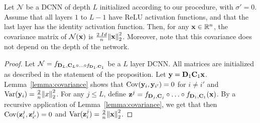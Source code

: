 \begin{proposition} \label{proposition:initialization}
Let $\mathcal{N}$ be a DCNN of depth $L$ initialized according to our procedure, with $\sigma'=0$.
Assume that all layers $1$ to $L-1$ have ReLU activation functions, and that the last layer has the identity activation function.
Then, for any $\mathbf{x} \in {\ensuremath \mathbb{R}}^{n}$, the covariance matrix of $\mathcal{N}(\mathbf{x})$ is $\frac{2.Id}{n}\norm{\mathbf{x}}_{2}^{2}$.
Moreover, note that this covariance does not depend on the depth of the network.
\end{proposition}
\begin{proof} 
Let $\mathcal{N} = f_{\mathbf{D}_{L}, \mathbf{C}_{L} \circ \ldots \circ f_{\mathbf{D}_{1}, \mathbf{C}_{1}}}$ be a $L$ layer DCNN.
All matrices are initialized as described in the statement of the proposition.
Let $\mathbf{y} = \mathbf{D}_{1} \mathbf{C}_{1} \mathbf{x}$.
Lemma~\ref{lemma:covariance} shows that $\mathrm{Cov}(\mathbf{y}_{i}, \mathbf{y}_{i'}) = 0$ for $i \neq i'$ and $\mathrm{Var}(\mathbf{y}_{i}) = \frac{2}{n}\norm{x}_{2}^{2}$.
For any $j \le L$, define $\mathbf{z}^j = f_{\mathbf{D}_j, \mathbf{C}_j} \circ \ldots \circ f_{\mathbf{D}_1, \mathbf{C}_1}(\mathbf{x})$.
By a recursive application of Lemma~\ref{lemma:covariance}, we get that then $\mathrm{Cov}(\mathbf{z}_i^j, \mathbf{z}_{i'}^j) = 0$ and $\mathrm{Var}(\mathbf{z}_i^j) = \frac{2}{n} \norm{\mathbf{x}}_2^2$.
\end{proof}

